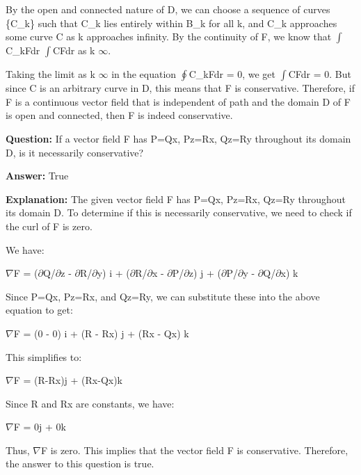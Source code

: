 \documentclass{article}
\begin{document}
By the open and connected nature of D, we can choose a sequence of curves \{C\_k\} such that C\_k lies entirely within B\_k for all k, and C\_k approaches some curve C as k approaches infinity. By the continuity of F, we know that \ensuremath{\int}C\_kF{\textperiodcentered}dr {\textrightarrow} \ensuremath{\int}CF{\textperiodcentered}dr as k {\textrightarrow} \ensuremath{\infty}.

Taking the limit as k {\textrightarrow} \ensuremath{\infty} in the equation \ensuremath{\oint}C\_kF{\textperiodcentered}dr = 0, we get \ensuremath{\int}CF{\textperiodcentered}dr = 0. But since C is an arbitrary curve in D, this means that F is conservative. Therefore, if F is a continuous vector field that is independent of path and the domain D of F is open and connected, then F is indeed conservative.
                
                \vspace{0.5cm} 
        
            
                \textbf {Question:} If a vector field F has P=Qx, Pz=Rx, Qz=Ry throughout its domain D, is it necessarily conservative?
                
                \textbf{Answer:} True

                \textbf{Explanation:} The given vector field F has P=Qx, Pz=Rx, Qz=Ry throughout its domain D. To determine if this is necessarily conservative, we need to check if the curl of F is zero.

We have:

\ensuremath{\nabla}{\texttimes}F = (\ensuremath{\partial}Q/\ensuremath{\partial}z - \ensuremath{\partial}R/\ensuremath{\partial}y) i + (\ensuremath{\partial}R/\ensuremath{\partial}x - \ensuremath{\partial}P/\ensuremath{\partial}z) j + (\ensuremath{\partial}P/\ensuremath{\partial}y - \ensuremath{\partial}Q/\ensuremath{\partial}x) k

Since P=Qx, Pz=Rx, and Qz=Ry, we can substitute these into the above equation to get:

\ensuremath{\nabla}{\texttimes}F = (0 - 0) i + (R - Rx) j + (Rx - Qx) k

This simplifies to:

\ensuremath{\nabla}{\texttimes}F = (R-Rx)j + (Rx-Qx)k

Since R and Rx are constants, we have:

\ensuremath{\nabla}{\texttimes}F = 0j + 0k

Thus, \ensuremath{\nabla}{\texttimes}F is zero. This implies that the vector field F is conservative. Therefore, the answer to this question is true.
                
\end{document}
